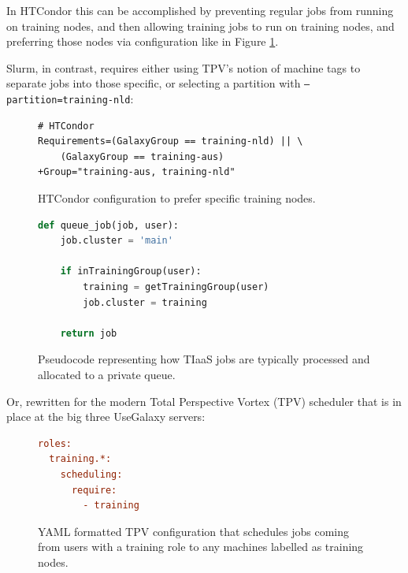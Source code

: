 \documentclass[a4paper,num-refs]{oup-contemporary}
\begin{document}
In HTCondor this can be accomplished by preventing regular jobs from running on training nodes, and then allowing training jobs to run on training nodes, and preferring those nodes via configuration like in Figure \ref{code:condorprefer}.

Slurm, in contrast, requires either using TPV's notion of machine tags to separate jobs into those specific, or selecting a partition with \texttt{--partition=training-nld}:

\begin{figure}[!ht]
\centering
\begin{lstlisting}[frame=single]  % Start your code-block
# HTCondor
Requirements=(GalaxyGroup == training-nld) || \
    (GalaxyGroup == training-aus)
+Group="training-aus, training-nld"
\end{lstlisting}
\caption{HTCondor configuration to prefer specific training nodes.\label{code:condorprefer}}
\end{figure}



\begin{figure}[!ht]
\centering
\begin{lstlisting}[frame=single,language=Python]  % Start your code-block
def queue_job(job, user):
    job.cluster = 'main'

    if inTrainingGroup(user):
        training = getTrainingGroup(user)
        job.cluster = training

    return job
\end{lstlisting}
\caption{Pseudocode representing how TIaaS jobs are typically processed and allocated to a private queue.\label{code:scheduler}}
\end{figure}

Or, rewritten for the modern Total Perspective Vortex (TPV) scheduler that is in place at the big three UseGalaxy servers:

\begin{figure}[!ht]
\centering
\begin{lstlisting}[frame=single,language=ini]  % Start your code-block
roles:
  training.*:
    scheduling:
      require:
        - training
\end{lstlisting}
\caption{YAML formatted TPV configuration that schedules jobs coming from users with a training role to any machines labelled as training nodes.\label{code:tpv}}
\end{figure}
\end{document}
